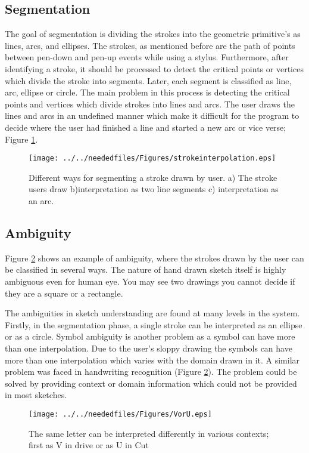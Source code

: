 \subsection {Segmentation}
The goal of segmentation is dividing the strokes into the geometric primitive's as lines, arcs, and ellipses. The strokes, as mentioned before are the path of points between pen-down and pen-up events while using a stylus. Furthermore, after identifying a stroke, it should be processed to detect the critical points or vertices which divide the stroke into segments. Later, each segment is classified as line, arc, ellipse or circle. The main problem in this process is detecting the critical points and vertices which divide strokes into lines and arcs. The user draws the lines and arcs in an undefined manner which make it difficult for the program to decide where the user had finished a line and started a new arc or vice verse;  Figure \ref {fig:strokeinterpolation}.
\begin{figure}

\begin{center}
		\texttt{[image: ../../neededfiles/Figures/strokeinterpolation.eps]}
	\caption[Segmentation Error]{Different ways for segmenting a stroke drawn by user. a) The stroke users draw b)interpretation as two line segments c) interpretation as an arc.\cite{earlyprocess}}
	\label{fig:strokeinterpolation}
\end{center}
\end{figure}

\subsection{Ambiguity}
Figure \ref{fig:VorU} shows an example of ambiguity, where the strokes drawn by the user can be classified in several ways. The nature of hand drawn sketch itself is highly ambiguous even for human eye. You may see two drawings you cannot decide if they are a square or a rectangle.

The ambiguities in sketch understanding are found at many levels in the system. Firstly, in the segmentation phase, a single stroke can be interpreted as an ellipse or as a circle. Symbol ambiguity is another problem as a symbol can have more than one interpolation. Due to the user's sloppy drawing the symbols can have more than one interpolation which varies with the domain drawn in it. A similar problem was faced in handwriting recognition (Figure \ref{fig:VorU}). The problem could be solved by providing context or domain information which could not be provided in most sketches. 
\begin{figure}	
	\centering
		\texttt{[image: ../../neededfiles/Figures/VorU.eps]}
	\caption[Handwriting Ambiguities] { The same letter can be interpreted differently in various contexts; first as V in drive or as U in Cut}
\label{fig:VorU}
\end{figure} 	

